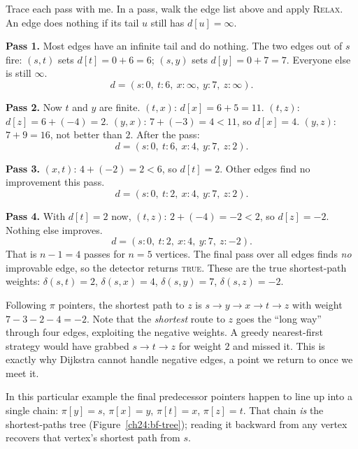 \begin{labbox}
Trace each pass with me. In a pass, walk the edge list above and apply
\textsc{Relax}. An edge does nothing if its tail $u$ still has $d[u]=\infty$.

\medskip
\textbf{Pass 1.} Most edges have an infinite tail and do nothing. The two edges
out of $s$ fire: $(s,t)$ sets $d[t]=0+6=6$; $(s,y)$ sets $d[y]=0+7=7$. Everyone
else is still $\infty$.
\[
d = (s{:}0,\ t{:}6,\ x{:}\infty,\ y{:}7,\ z{:}\infty).
\]

\medskip
\textbf{Pass 2.} Now $t$ and $y$ are finite. $(t,x)$: $d[x]=6+5=11$. $(t,z)$:
$d[z]=6+(-4)=2$. $(y,x)$: $7+(-3)=4 < 11$, so $d[x]=4$. $(y,z)$:
$7+9=16$, not better than $2$. After the pass:
\[
d = (s{:}0,\ t{:}6,\ x{:}4,\ y{:}7,\ z{:}2).
\]

\medskip
\textbf{Pass 3.} $(x,t)$: $4+(-2)=2 < 6$, so $d[t]=2$. Other edges find no
improvement this pass.
\[
d = (s{:}0,\ t{:}2,\ x{:}4,\ y{:}7,\ z{:}2).
\]

\medskip
\textbf{Pass 4.} With $d[t]=2$ now, $(t,z)$: $2+(-4)=-2 < 2$, so $d[z]=-2$. Nothing
else improves.
\[
d = (s{:}0,\ t{:}2,\ x{:}4,\ y{:}7,\ z{:}-2).
\]
That is $n-1 = 4$ passes for $n=5$ vertices. The final pass over all edges finds
\emph{no} improvable edge, so the detector returns \textsc{true}. These are the
true shortest-path weights: $\delta(s,t)=2$, $\delta(s,x)=4$, $\delta(s,y)=7$,
$\delta(s,z)=-2$.
\end{labbox}

Following $\pi$ pointers, the shortest path to $z$ is
$s \to y \to x \to t \to z$ with weight $7-3-2-4=-2$. Note that the
\emph{shortest} route to $z$ goes the ``long way'' through four edges, exploiting
the negative weights. A greedy nearest-first strategy would have grabbed
$s\to t\to z$ for weight $2$ and missed it. This is exactly why Dijkstra cannot
handle negative edges, a point we return to once we meet it.

In this particular example the final predecessor pointers happen to line up into a
single chain: $\pi[y]=s$, $\pi[x]=y$, $\pi[t]=x$, $\pi[z]=t$. That chain
\emph{is} the shortest-paths tree (Figure~\ref{ch24:bf-tree}); reading it backward
from any vertex recovers that vertex's shortest path from $s$.

